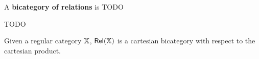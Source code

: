 %


\begin{definition}
A {\bf bicategory of relations} is  TODO
\end{definition}

TODO

\begin{lemma}
Given a regular category $\mathbb{X}$, $\mathsf{Rel}(\mathbb{X})$ is a cartesian bicategory with respect to the cartesian product.
\end{lemma}


